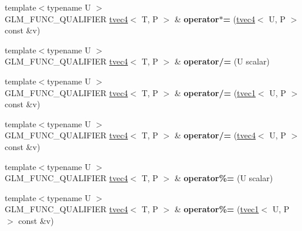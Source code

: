 \begin{DoxyCompactItemize}
\item 
\mbox{\label{structglm_1_1tvec4_a6746eded03379870b12de89276141991}} 
{\footnotesize template$<$typename U $>$ }\\G\+L\+M\+\_\+\+F\+U\+N\+C\+\_\+\+Q\+U\+A\+L\+I\+F\+I\+ER \hyperlink{structglm_1_1tvec4}{tvec4}$<$ T, P $>$ \& {\bfseries operator$\ast$=} (\hyperlink{structglm_1_1tvec4}{tvec4}$<$ U, P $>$ const \&v)
\item 
\mbox{\label{structglm_1_1tvec4_a0556c8f92c2267b088c76c883b355ff0}} 
{\footnotesize template$<$typename U $>$ }\\G\+L\+M\+\_\+\+F\+U\+N\+C\+\_\+\+Q\+U\+A\+L\+I\+F\+I\+ER \hyperlink{structglm_1_1tvec4}{tvec4}$<$ T, P $>$ \& {\bfseries operator/=} (U scalar)
\item 
\mbox{\label{structglm_1_1tvec4_a75fde6792f702029d92cfb3502a7e8ea}} 
{\footnotesize template$<$typename U $>$ }\\G\+L\+M\+\_\+\+F\+U\+N\+C\+\_\+\+Q\+U\+A\+L\+I\+F\+I\+ER \hyperlink{structglm_1_1tvec4}{tvec4}$<$ T, P $>$ \& {\bfseries operator/=} (\hyperlink{structglm_1_1tvec1}{tvec1}$<$ U, P $>$ const \&v)
\item 
\mbox{\label{structglm_1_1tvec4_accd622c14fd14f612f8cb52e1d669163}} 
{\footnotesize template$<$typename U $>$ }\\G\+L\+M\+\_\+\+F\+U\+N\+C\+\_\+\+Q\+U\+A\+L\+I\+F\+I\+ER \hyperlink{structglm_1_1tvec4}{tvec4}$<$ T, P $>$ \& {\bfseries operator/=} (\hyperlink{structglm_1_1tvec4}{tvec4}$<$ U, P $>$ const \&v)
\item 
\mbox{\label{structglm_1_1tvec4_af438ebaf22a88b79e0db2a23738f6bb3}} 
{\footnotesize template$<$typename U $>$ }\\G\+L\+M\+\_\+\+F\+U\+N\+C\+\_\+\+Q\+U\+A\+L\+I\+F\+I\+ER \hyperlink{structglm_1_1tvec4}{tvec4}$<$ T, P $>$ \& {\bfseries operator\%=} (U scalar)
\item 
\mbox{\label{structglm_1_1tvec4_abf42924fdc633b087a0bb2d91830fbce}} 
{\footnotesize template$<$typename U $>$ }\\G\+L\+M\+\_\+\+F\+U\+N\+C\+\_\+\+Q\+U\+A\+L\+I\+F\+I\+ER \hyperlink{structglm_1_1tvec4}{tvec4}$<$ T, P $>$ \& {\bfseries operator\%=} (\hyperlink{structglm_1_1tvec1}{tvec1}$<$ U, P $>$ const \&v)

\end{DoxyCompactItemize}
